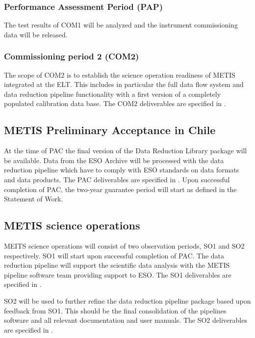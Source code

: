 \subsubsection{Performance Assessment Period (PAP)}
\label{ssec:pap}

The test results of COM1 will be analyzed and the instrument commissioning data will be released.

\subsubsection{Commissioning period 2 (COM2)}
\label{ssec:com2}

The scope of COM2 is to establish the science operation readiness of METIS integrated at the ELT. This includes in particular the full data flow system and data reduction pipeline functionality with a first version of a completely populated calibration data base. The COM2 deliverables are specified in \cite{1618}.

\subsection{METIS Preliminary Acceptance in Chile}
\label{ssec:pae_chile}

At the time of PAC the final version of the Data Reduction Library package will be available. Data from the ESO Archive will be processed with the data reduction pipeline  which have to comply with ESO standards on data formats and data products. The PAC deliverables are specified in \cite{1618}. Upon successful completion of PAC, the two-year guarantee period will start as defined in the Statement of Work.

\subsection{METIS science operations}
\label{ssec:sciops}

MEITS science operations will consist of two observation periods, SO1 and SO2 respectively. SO1 will start upon successful completion of PAC. The data reduction pipeline will support the scientific data analysis with the METIS pipeline software team providing support to ESO. The SO1 deliverables are specified in \cite{1618}.

SO2 will be used to further refine the data reduction pipeline package based upon feedback from SO1. This should be the final consolidation of the pipelines software and all relevant documentation and user manuals. The SO2 deliverables are specified in \cite{1618}.
